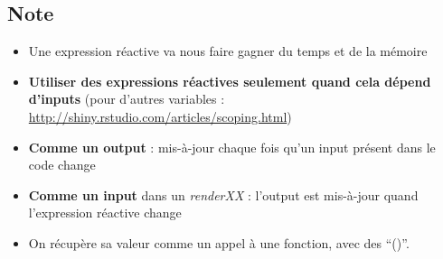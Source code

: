 \documentclass[
]{article}
\newenvironment{Shaded}{\begin{snugshade}}{\end{snugshade}}
\newcommand{\AttributeTok}[1]{\textcolor[rgb]{0.77,0.63,0.00}{#1}}
\newcommand{\ConstantTok}[1]{\textcolor[rgb]{0.00,0.00,0.00}{#1}}
\newcommand{\DecValTok}[1]{\textcolor[rgb]{0.00,0.00,0.81}{#1}}
\newcommand{\FunctionTok}[1]{\textcolor[rgb]{0.00,0.00,0.00}{#1}}
\newcommand{\NormalTok}[1]{#1}
\newcommand{\OtherTok}[1]{\textcolor[rgb]{0.56,0.35,0.01}{#1}}
\newcommand{\SpecialCharTok}[1]{\textcolor[rgb]{0.00,0.00,0.00}{#1}}
\newcommand{\StringTok}[1]{\textcolor[rgb]{0.31,0.60,0.02}{#1}}
\begin{document}
\begin{Shaded}
\end{Shaded}

\hypertarget{note}{%
\subsection{Note}\label{note}}

\begin{itemize}
\item
  Une expression réactive va nous faire gagner du temps et de la mémoire
\item
  \textbf{Utiliser des expressions réactives seulement quand cela dépend
  d'inputs} (pour d'autres variables :
  \url{http://shiny.rstudio.com/articles/scoping.html})
\item
  \textbf{Comme un output} : mis-à-jour chaque fois qu'un input présent
  dans le code change
\item
  \textbf{Comme un input} dans un \emph{renderXX} : l'output est
  mis-à-jour quand l'expression réactive change
\item
  On récupère sa valeur comme un appel à une fonction, avec des ``()''.
\end{itemize}
\end{document}
